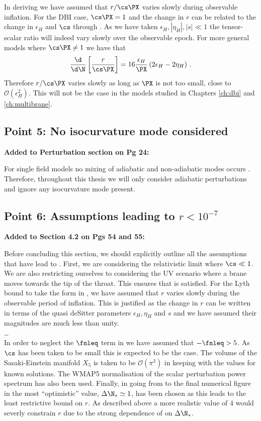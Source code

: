 In deriving  we have assumed that $r/\cs \PX$ varies slowly during
observable inflation. For the DBI case, $\cs \PX = 1$ and the change in $r$ can be related to the
change in $\epsilon_H$ and $\cs$ through . As we have taken $\epsilon_H,
|\eta_H|,|s|\ll 1$ the tensor-scalar ratio will indeed vary slowly over the observable epoch.
% 
For more general models where $\cs \PX \ne 1$ we have that
% 
\begin{equation}
 \frac{\d }{\d \N}\left[ \frac{r}{\cs \PX}\right] = 16\frac{\epsilon_H}{\PX}\left( 2\epsilon_H
-2\eta_H\right)\,.
\end{equation}
% 
Therefore $r/\cs\PX$ varies slowly as long as $\PX$ is not too small, \iec close to
$\mathcal{O}(\epsilon_H^2)$. This will not be the case in the models studied in Chapters
\ref{ch:dbi} and \ref{ch:multibrane}.

\subsection{Point 5: No isocurvature mode considered}
\textbf{Added to Perturbation section on Pg 24:}

For single field models no mixing
of adiabatic and non-adiabatic modes occurs \cite{Weinberg200804}. Therefore, throughout this
thesis we will only consider adiabatic perturbations and ignore any isocurvature mode present.

\subsection{Point 6: Assumptions leading to $r<10^{-7}$}
\textbf{Added to Section 4.2 on Pgs 54 and 55:}


Before concluding this section, we should explicitly outline all the assumptions that have lead to
. First, we are considering the relativistic limit where $\cs\ll1$. We are
also restricting ourselves to considering the UV scenario where a brane moves towards the tip of
the throat. This ensures that  is satisfied. For the Lyth bound to take the
form in , we have assumed that $r$ varies slowly during the observable
period of inflation. This is justified as the change in $r$ can be written in terms of the
quasi deSitter parameters $\epsilon_H, \eta_H$ and $s$ and we have assumed their magnitudes are
much less than unity.
\\
\ldots
\\
In order to neglect the $\fnleq$ term in  we have assumed that $-\fnleq>5$. As
$\cs$ has been taken to be small this is expected to be the case. The volume of the Sasaki-Einstein
manifold $X_5$ is taken to be $\mathcal{O}(\pi^3)$ in keeping with the values for known solutions.
The WMAP5 normalisation of the scalar perturbation power spectrum has also been used. Finally, in
going from  to the final numerical figure in  the most
``optimistic'' value, $\Delta \N_*\simeq 1$, has been chosen as this leads to the least
restrictive bound on $r$.  As described above a more realistic value of $4$ would severly
constrain $r$ due to the strong dependence of  on $\Delta\N_*$.

